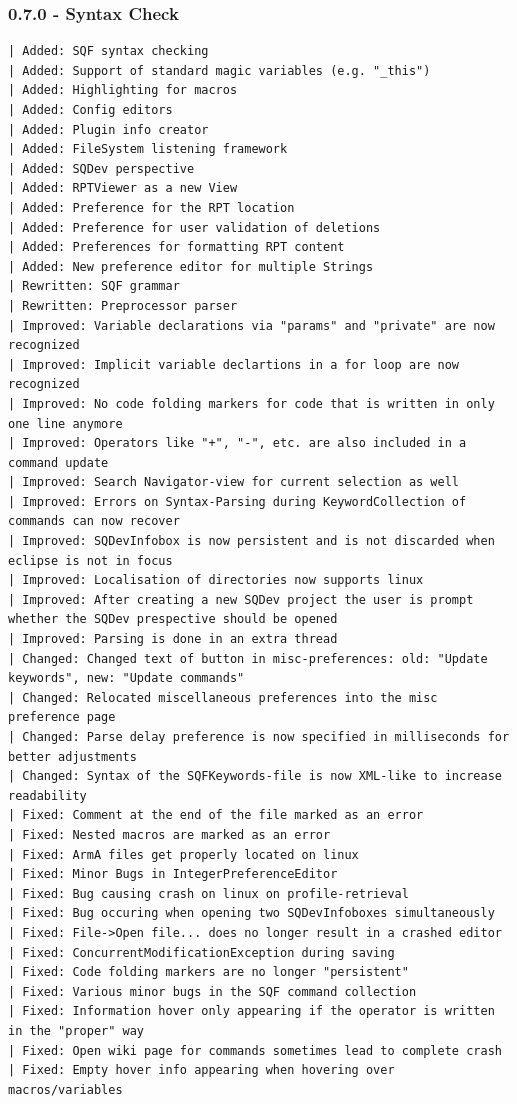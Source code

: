 \documentclass[twoside=false]{scrbook}
\begin{document}
	\subsubsection*{0.7.0 - Syntax Check}
	\begin{lstlisting}[breaklines=true]
| Added: SQF syntax checking
| Added: Support of standard magic variables (e.g. "_this")
| Added: Highlighting for macros
| Added: Config editors
| Added: Plugin info creator
| Added: FileSystem listening framework
| Added: SQDev perspective
| Added: RPTViewer as a new View
| Added: Preference for the RPT location
| Added: Preference for user validation of deletions
| Added: Preferences for formatting RPT content
| Added: New preference editor for multiple Strings
| Rewritten: SQF grammar
| Rewritten: Preprocessor parser
| Improved: Variable declarations via "params" and "private" are now recognized
| Improved: Implicit variable declartions in a for loop are now recognized
| Improved: No code folding markers for code that is written in only one line anymore
| Improved: Operators like "+", "-", etc. are also included in a command update
| Improved: Search Navigator-view for current selection as well
| Improved: Errors on Syntax-Parsing during KeywordCollection of commands can now recover
| Improved: SQDevInfobox is now persistent and is not discarded	when eclipse is not in focus
| Improved: Localisation of directories now supports linux
| Improved: After creating a new SQDev project the user is prompt whether the SQDev prespective should be opened
| Improved: Parsing is done in an extra thread
| Changed: Changed text of button in misc-preferences: old: "Update keywords", new: "Update commands"
| Changed: Relocated miscellaneous preferences into the misc preference page
| Changed: Parse delay preference is now specified in milliseconds for better adjustments
| Changed: Syntax of the SQFKeywords-file is now XML-like to increase readability
| Fixed: Comment at the end of the file marked as an error
| Fixed: Nested macros are marked as an error
| Fixed: ArmA files get properly located on linux
| Fixed: Minor Bugs in IntegerPreferenceEditor
| Fixed: Bug causing crash on linux on profile-retrieval
| Fixed: Bug occuring when opening two SQDevInfoboxes simultaneously
| Fixed: File->Open file... does no longer result in a crashed editor
| Fixed: ConcurrentModificationException during saving
| Fixed: Code folding markers are no longer "persistent"
| Fixed: Various minor bugs in the SQF command collection
| Fixed: Information hover only appearing if the operator is written in the "proper" way
| Fixed: Open wiki page for commands sometimes lead to complete crash
| Fixed: Empty hover info appearing when hovering over macros/variables
	\end{lstlisting}
	
\end{document}
